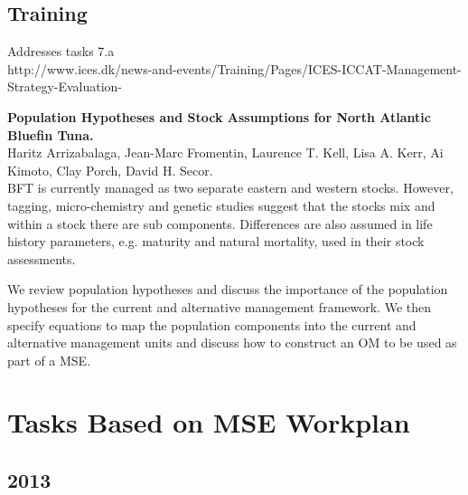 \subsection{Training}

Addresses tasks  7.a\\

http://www.ices.dk/news-and-events/Training/Pages/ICES-ICCAT-Management-Strategy-Evaluation-%


\textbf{Population Hypotheses and Stock Assumptions for North Atlantic Bluefin Tuna.}\\
Haritz Arrizabalaga,  Jean-Marc Fromentin, Laurence T. Kell, Lisa A. Kerr, Ai Kimoto, Clay Porch, David H. Secor.\\
                     
\gls{BFT} is currently managed as two separate eastern and western stocks. However, tagging, 
micro-chemistry and genetic studies suggest that the stocks mix and within a stock there are
sub components. Differences are also assumed in life history parameters, e.g. maturity 
and natural mortality, used in their stock assessments.

We review population hypotheses and discuss the importance of the population hypotheses 
for the current and alternative management framework. We then specify  
equations to map the population components into the current and alternative 
management units and discuss how to construct an \gls{OM} to be used 
as part of a \gls{MSE}.


\section{Tasks Based on MSE Workplan}

\subsection{2013}

